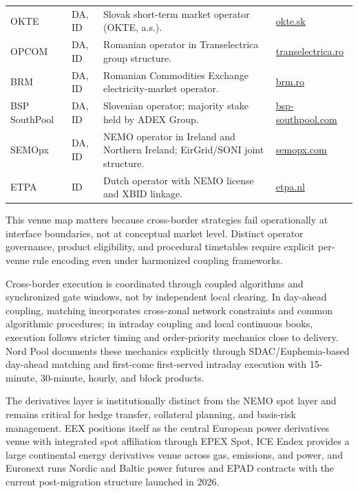 \documentclass[oneside,10pt]{swissi}
\begin{document}
\begin{table}[htbp]
\begin{tabularx}{\textwidth}{p{1.8cm} p{1.7cm} X p{2.6cm}}
OKTE & DA, ID & Slovak short-term market operator (OKTE, a.s.).\cite{okte_dam_overview_2026} & \href{https://www.okte.sk/en/short-term-market/published-information-of-dam/day-ahead-detailed-overview/}{okte.sk} \\
OPCOM & DA, ID & Romanian operator in Transelectrica group structure.\cite{transelectrica_opcom_2026} & \href{https://www.transelectrica.ro/web/tel/opcom}{transelectrica.ro} \\
BRM & DA, ID & Romanian Commodities Exchange electricity-market operator.\cite{brm_markets_2026} & \href{https://brm.ro/en/markets/}{brm.ro} \\
BSP SouthPool & DA, ID & Slovenian operator; majority stake held by ADEX Group.\cite{bsp_about_2026,adex_bsp_majority_2024} & \href{https://www.bsp-southpool.com/about-us/}{bsp-southpool.com} \\
SEMOpx & DA, ID & NEMO operator in Ireland and Northern Ireland; EirGrid/SONI joint structure.\cite{semopx_about_2026} & \href{https://www.semopx.com/about/}{semopx.com} \\
ETPA & ID & Dutch operator with NEMO license and XBID linkage.\cite{etpa_about_2026,etpa_nemo_license_2024} & \href{https://www.etpa.nl/en/about}{etpa.nl} \\
\bottomrule
\end{tabularx}
\end{table}

This venue map matters because cross-border strategies fail operationally at interface boundaries, not at conceptual market level. Distinct operator governance, product eligibility, and procedural timetables require explicit per-venue rule encoding even under harmonized coupling frameworks.\cite{acer_market_coupling_development_2026,acer_final_assessment_report_2022}

Cross-border execution is coordinated through coupled algorithms and synchronized gate windows, not by independent local clearing. In day-ahead coupling, matching incorporates cross-zonal network constraints and common algorithmic procedures; in intraday coupling and local continuous books, execution follows stricter timing and order-priority mechanics close to delivery. Nord Pool documents these mechanics explicitly through SDAC/Euphemia-based day-ahead matching and first-come first-served intraday execution with 15-minute, 30-minute, hourly, and block products.\cite{acer_market_coupling_development_2026,nord_pool_day_ahead_2026,nord_pool_intraday_2026}

The derivatives layer is institutionally distinct from the NEMO spot layer and remains critical for hedge transfer, collateral planning, and basis-risk management. EEX positions itself as the central European power derivatives venue with integrated spot affiliation through EPEX Spot, ICE Endex provides a large continental energy derivatives venue across gas, emissions, and power, and Euronext runs Nordic and Baltic power futures and EPAD contracts with the current post-migration structure launched in 2026.\cite{eex_power_2026,ice_endex_2026,euronext_nord_pool_power_2026}
\end{document}

